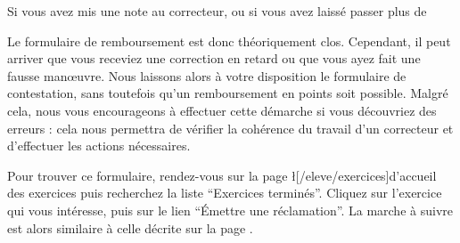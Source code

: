﻿Si vous avez mis une note au correcteur, ou si vous avez laissé passer plus de %

Le formulaire de remboursement est donc théoriquement clos. Cependant, il peut arriver que vous receviez une correction en retard ou que vous ayez fait une fausse manœuvre. Nous laissons alors à votre disposition le formulaire de contestation, sans toutefois qu’un remboursement en points soit possible.
Malgré cela, nous vous encourageons à effectuer cette démarche si vous découvriez des erreurs : cela nous permettra de vérifier la cohérence du travail d’un correcteur et d’effectuer les actions nécessaires.

Pour trouver ce formulaire, rendez-vous sur la page \l[/eleve/exercices]{d’accueil des exercices} puis recherchez la liste “Exercices terminés”.
Cliquez sur l’exercice qui vous intéresse, puis sur le lien “Émettre une réclamation”.
La marche à suivre est alors similaire à celle décrite sur la page .
